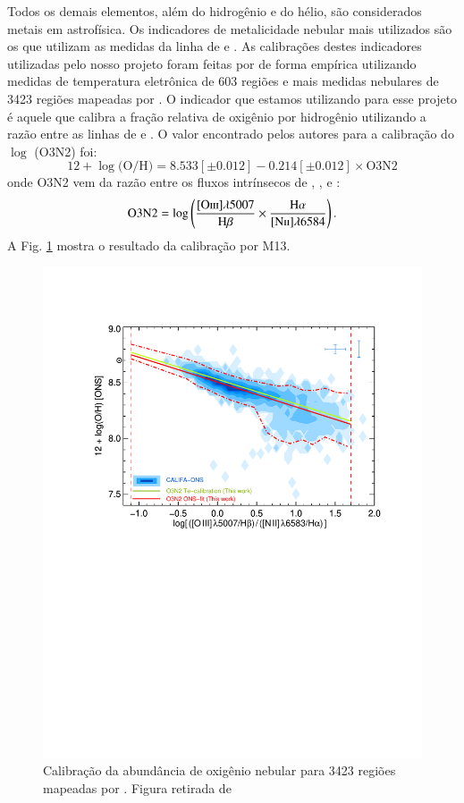 Todos os demais elementos, além do hidrogênio e do hélio, são considerados metais em astrofísica.
Os indicadores de metalicidade nebular mais utilizados são os que utilizam as medidas da
linha de \OIII e \NII. As calibrações destes indicadores utilizadas pelo nosso projeto foram feitas por
\citet[][M13 daqui em diante]{Marino.etal.2013a} de forma empírica utilizando medidas de temperatura
eletrônica de 603 regiões \Hii e mais medidas nebulares de 3423 regiões \Hii mapeadas por \citet{Sanchez.etal.2013a}.
O indicador que estamos utilizando para esse projeto é aquele que calibra a fração relativa de
oxigênio por hidrogênio utilizando a razão entre as linhas de \oIII e \nII. O valor encontrado pelos
autores para a calibração do $\log$ (O3N2) foi:
\begin{equation}
	12 + \log \textrm{(O/H)} = 8.533[\pm0.012] - 0.214[\pm0.012]\times \textrm{O3N2}
\end{equation}
\noindent onde O3N2 vem da razão entre os fluxos intrínsecos de \oIII, \Hbeta, \nII e \Halpha:
\begin{equation}
	\textrm{O3N2} = \log \left(\frac{\OIII}{\Hbeta} \times \frac{\Halpha}{\NII}\right). 
\end{equation}
A Fig. \ref{fig:Marino2013_O3N2} mostra o resultado da calibração por M13.

\begin{figure}
	\centering
	\includegraphics[scale=0.7, trim=2cm 13cm 2cm 3cm, clip]{figuras/O3N2_CALIFA.pdf}
	\caption[Calibração da abundância de oxigênio no gás]{Calibração da abundância de oxigênio 
	nebular	para 3423 regiões \Hii mapeadas por \citet{Sanchez.etal.2013a}. Figura retirada de 
	\citet{Marino.etal.2013a}}
	\label{fig:Marino2013_O3N2}
\end{figure}

